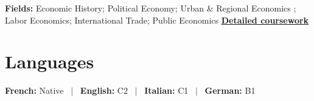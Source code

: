 \documentclass[a4paper,11pt]{article}
\begin{document}
\textbf{Fields:} Economic History; Political Economy; Urban \& Regional Economics ; Labor Economics; International Trade; Public Economics \hfill
\href{https://ecomperat.github.io/courses.html}{\textbf{Detailed coursework}}


\section{Languages}

\normalsize
\textbf{French:} Native \ $|$ \ \textbf{English:} C2 \ $|$ \ \textbf{Italian:} C1 \ $|$ \ \textbf{German:} B1

\end{document}

